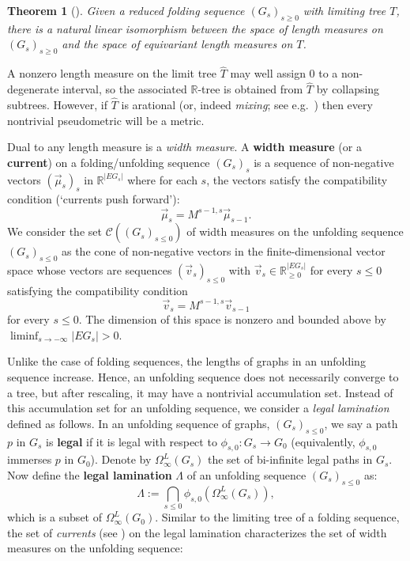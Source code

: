 \documentclass[11pt, letterpaper]{amsart}
\theoremstyle{plain}
\newtheorem{theorem}{Theorem}[section]
\theoremstyle{definition}
\newcommand{\R}{\mathbb{R}}
\newcommand{\calC}{\mathcal{C}}
\begin{document}
\begin{theorem}[{\cite[Proposition 5.4]{NPR2014}}] \label{thm:NPR-foldingsequence}
    Given a reduced folding sequence $(G_s)_{s \ge 0}$ with limiting tree $T$,
    there is a natural linear isomorphism between the space of length measures
    on $(G_s)_{s \ge 0}$ and the space of equivariant length measures on
    $T$.
    
\end{theorem}

A nonzero length measure on the limit tree $\hat{T}$ may well assign 0 to a non-degenerate
interval, so the associated $\R$-tree is obtained from $\hat{T}$ by 
collapsing subtrees.  
However, if $\hat T$ is arational (or, indeed \textit{mixing}; see e.g.\  \cite{morgan1988ergodic,morgan1992trees})  
then every nontrivial pseudometric will be a metric.

    Dual to any length measure is a \emph{width measure}. A \textbf{width measure}
    (or a \textbf{current}) on a folding/unfolding sequence $(G_s)_s$ is a
    sequence of non-negative vectors $(\vec{\mu}_s)_s$ in $\R^{|EG_s|}$ where for each $s$, the vectors satisfy the compatibility condition (`currents push forward'):
    \[
        \vec{\mu}_s = M^{s-1,s}\vec{\mu}_{s-1}.
    \]
    We consider the set $\calC((G_s)_{s\le 0})$ of width
    measures on the unfolding sequence $(G_s)_{s \le 0}$ as the cone
    of non-negative vectors in the finite-dimensional vector space
    whose vectors are sequences $(\vec{v}_s)_{s \le 0}$ with
    $\vec{v}_s \in \R_{\geq 0}^{|EG_s|}$  for every $s \le 0$ satisfying the compatibility condition
    \[
        \vec{v}_{s} = M^{s-1,s}\vec{v}_{s-1}
    \]
    for every $s \le 0$. The dimension of this space is nonzero and bounded above by $\liminf_{s \to -\infty} |EG_s|>0$.

    Unlike the case of folding sequences, the lengths of graphs in an unfolding
    sequence increase. Hence, an unfolding sequence does not necessarily converge
    to a tree, but after rescaling, it may have a nontrivial accumulation set.
    Instead of this accumulation set for an unfolding sequence, we consider a \emph{legal lamination} defined as follows.
        In an unfolding sequence of graphs, $(G_s)_{s \le 0}$, we say a path $p$ in
    $G_s$ is \textbf{legal} if it is legal with respect to $\phi_{s,0}:G_s\to
    G_0$ (equivalently, $\phi_{s,0}$ immerses $p$ in $G_0$). Denote by $\Omega_{\infty}^L(G_s)$ the set of bi-infinite legal
    paths in $G_s$. Now define the \textbf{legal lamination} $\Lambda$ of an unfolding
    sequence $(G_s)_{s \le 0}$ as:
    \[
      \Lambda:= \bigcap_{s \le 0}\phi_{s,0}(\Omega_{\infty}^L(G_s)),
    \]
    which is a subset of $\Omega_{\infty}^L(G_0)$. 
    Similar to the limiting tree
    of a folding sequence, the set of \emph{currents} (see ) on the legal lamination characterizes
    the set of width measures on the unfolding sequence:
\end{document}
